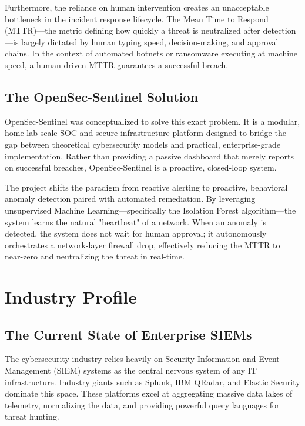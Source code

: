 \documentclass[12pt, a4paper]{report}
\begin{document}
	Furthermore, the reliance on human intervention creates an unacceptable bottleneck in the incident response lifecycle. The Mean Time to Respond (MTTR)—the metric defining how quickly a threat is neutralized after detection—is largely dictated by human typing speed, decision-making, and approval chains. In the context of automated botnets or ransomware executing at machine speed, a human-driven MTTR guarantees a successful breach.
	
	\section*{The OpenSec-Sentinel Solution}
	OpenSec-Sentinel was conceptualized to solve this exact problem. It is a modular, home-lab scale SOC and secure infrastructure platform designed to bridge the gap between theoretical cybersecurity models and practical, enterprise-grade implementation. Rather than providing a passive dashboard that merely reports on successful breaches, OpenSec-Sentinel is a proactive, closed-loop system.
	
	The project shifts the paradigm from reactive alerting to proactive, behavioral anomaly detection paired with automated remediation. By leveraging unsupervised Machine Learning—specifically the Isolation Forest algorithm—the system learns the natural "heartbeat" of a network. When an anomaly is detected, the system does not wait for human approval; it autonomously orchestrates a network-layer firewall drop, effectively reducing the MTTR to near-zero and neutralizing the threat in real-time.
	
	\chapter{Industry Profile}
	\onehalfspacing
	
	\section{The Current State of Enterprise SIEMs}
	The cybersecurity industry relies heavily on Security Information and Event Management (SIEM) systems as the central nervous system of any IT infrastructure. Industry giants such as Splunk, IBM QRadar, and Elastic Security dominate this space. These platforms excel at aggregating massive data lakes of telemetry, normalizing the data, and providing powerful query languages for threat hunting.
	
\end{document}
